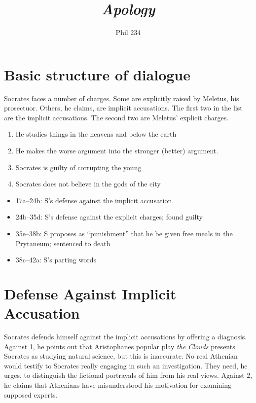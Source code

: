 \documentclass[10 pt]{article}
\begin{document}
\author{Phil 234}
\title{\emph{Apology}}
\maketitle

\section*{Basic structure of dialogue}

Socrates faces a number of charges. Some are explicitly raised by Meletus, his prosectuor. Others, he claims, are implicit accusations. The first two in the list are the implicit accusations. The second two are Meletus' explicit charges.

\begin{enumerate}
\item He studies things in the heavens and below the earth
\item He makes the worse argument into the stronger (better) argument.
\item Socrates is guilty of corrupting the young
\item Socrates does not believe in the gods of the city
\end{enumerate}


\begin{itemize}
\item 17a--24b: S's defense against the implicit accusation. 
\item 24b--35d: S's defense against the explicit charges; found guilty
\item  35e--38b: S proposes as ``punishment'' that he be given free meals in the Prytaneum; sentenced to death
\item 38c--42a: S's parting words
\end{itemize}

\section*{Defense Against Implicit Accusation}
Socrates defends himself against the implicit  accusations by offering a diagnosis. Against 1, he points out that Aristophanes popular play \emph{the Clouds} presents Socrates as studying natural science, but this is inaccurate. No real Athenian would testify to Socrates really engaging in such an investigation. They need, he urges, to distinguish the fictional portrayals of him from his real views. Against 2, he claims that Athenians have misunderstood his motivation for examining supposed experts. 
\end{document}

